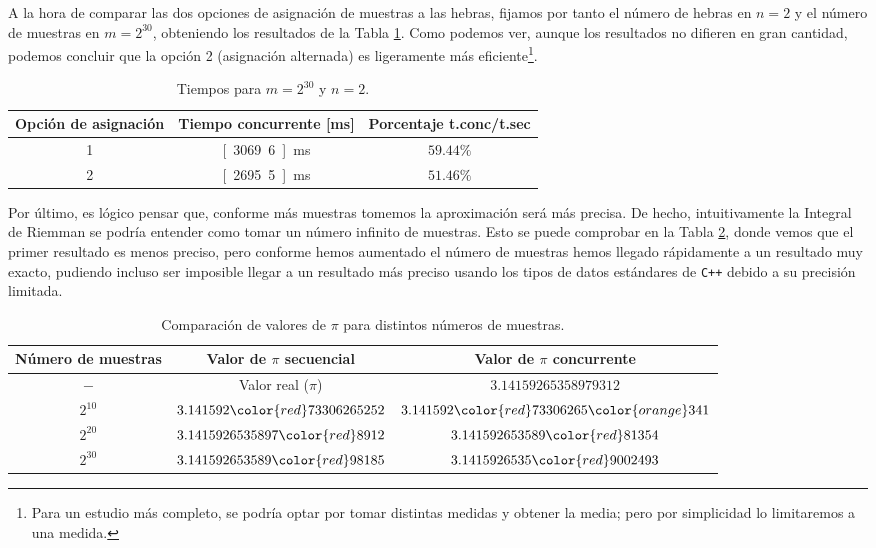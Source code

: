 \documentclass[12pt]{book}
\begin{document}
    A la hora de comparar las dos opciones de asignación de muestras a las hebras, fijamos por tanto el número de hebras en $n=2$ y el número de muestras en $m=2^{30}$, obteniendo
    los resultados de la Tabla \ref{tab:dist_opciones}. Como podemos ver, aunque
    los resultados no difieren en gran cantidad, podemos concluir que la opción 2 (asignación alternada) es ligeramente más eficiente\footnote{Para un estudio más completo, se podría optar por tomar distintas medidas y obtener la media; pero por simplicidad lo limitaremos a una medida.}.
    \begin{table}
        \centering
        \begin{tabular}{|c|c|c|}
            \hline
            \textbf{Opción de asignación} & \textbf{Tiempo concurrente [ms]} & \textbf{Porcentaje t.conc/t.sec} \\
            \hline
            1 & \unit[3069.6]{ms} & $59.44\%$ \\
            2 & \unit[2695.5]{ms} & $51.46\%$ \\
            \hline
        \end{tabular}
        \caption{Tiempos para $m=2^{30}$ y $n=2$.}
        \label{tab:dist_opciones}
    \end{table}

    Por último, es lógico pensar que, conforme más muestras tomemos la aproximación será más precisa. De hecho,
    intuitivamente la Integral de Riemman se podría entender como tomar un número infinito
    de muestras. Esto se puede comprobar en la Tabla \ref{tab:dist_num_muestras}, donde vemos que el primer resultado es menos preciso,
    pero conforme hemos aumentado el número de muestras hemos llegado rápidamente a un resultado muy exacto, pudiendo incluso ser imposible
    llegar a un resultado más preciso usando los tipos de datos estándares de \verb|C++| debido a su precisión limitada.
    \begin{table}
        \centering
        \begin{tabular}{|c|c|c|}
            \hline
            \textbf{Número de muestras} & \textbf{Valor de $\pi$ secuencial} & \textbf{Valor de $\pi$ concurrente} \\
            \hline
            $-$ & Valor real ($\pi$) & $3.14159265358979312$ \\
            $2^{10}$ & $3.141592{\color{red}7}3306265252$ & $3.141592{\color{red}7}3306265{\color{orange}3}41$ \\
            $2^{20}$ & $3.1415926535897{\color{red}8}912$ & $3.141592653589{\color{red}8}1354$ \\
            $2^{30}$ & $3.141592653589{\color{red}9}8185$ & $3.1415926535{\color{red}9}002493$ \\
            \hline
        \end{tabular}
        \caption{Comparación de valores de $\pi$ para distintos números de muestras.}
        \label{tab:dist_num_muestras}
    \end{table}
\end{document}
